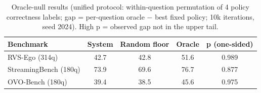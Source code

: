 \begin{table}[t]
\centering
\caption{Oracle-null results (unified protocol: within-question permutation of 4 policy correctness labels; gap = per-question oracle $-$ best fixed policy; 10k iterations, seed 2024). High p = observed gap not in the upper tail.}
\label{tab:null}
\small
\begin{tabular}{@{}lcccc@{}}
\toprule
Benchmark & System & Random floor & Oracle & p (one-sided) \\
\midrule
RVS-Ego (314q) & 42.7 & 42.8 & 51.6 & 0.989 \\
StreamingBench (180q) & 73.9 & 69.6 & 76.7 & 0.877 \\
OVO-Bench (180q) & 39.4 & 38.5 & 45.6 & 0.975 \\
\bottomrule
\end{tabular}
\end{table}
